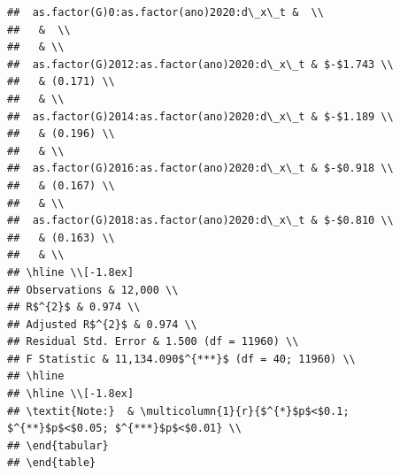 \documentclass[
]{article}
\begin{document}
\begin{verbatim}
##  as.factor(G)0:as.factor(ano)2020:d\_x\_t &  \\ 
##   &  \\ 
##   & \\ 
##  as.factor(G)2012:as.factor(ano)2020:d\_x\_t & $-$1.743 \\ 
##   & (0.171) \\ 
##   & \\ 
##  as.factor(G)2014:as.factor(ano)2020:d\_x\_t & $-$1.189 \\ 
##   & (0.196) \\ 
##   & \\ 
##  as.factor(G)2016:as.factor(ano)2020:d\_x\_t & $-$0.918 \\ 
##   & (0.167) \\ 
##   & \\ 
##  as.factor(G)2018:as.factor(ano)2020:d\_x\_t & $-$0.810 \\ 
##   & (0.163) \\ 
##   & \\ 
## \hline \\[-1.8ex] 
## Observations & 12,000 \\ 
## R$^{2}$ & 0.974 \\ 
## Adjusted R$^{2}$ & 0.974 \\ 
## Residual Std. Error & 1.500 (df = 11960) \\ 
## F Statistic & 11,134.090$^{***}$ (df = 40; 11960) \\ 
## \hline 
## \hline \\[-1.8ex] 
## \textit{Note:}  & \multicolumn{1}{r}{$^{*}$p$<$0.1; $^{**}$p$<$0.05; $^{***}$p$<$0.01} \\ 
## \end{tabular} 
## \end{table}
\end{verbatim}
\end{document}
